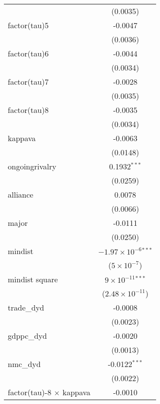 \begin{tabular}{lc}
                                   & (0.0035)\\   
   factor(tau)5                    & -0.0047\\   
                                   & (0.0036)\\   
   factor(tau)6                    & -0.0044\\   
                                   & (0.0034)\\   
   factor(tau)7                    & -0.0028\\   
                                   & (0.0035)\\   
   factor(tau)8                    & -0.0035\\   
                                   & (0.0034)\\   
   kappava                         & -0.0063\\   
                                   & (0.0148)\\   
   ongoingrivalry                  & 0.1932$^{***}$\\   
                                   & (0.0259)\\   
   alliance                        & 0.0078\\   
                                   & (0.0066)\\   
   major                           & -0.0111\\   
                                   & (0.0250)\\   
   mindist                         & $-1.97\times 10^{-6}$$^{***}$\\    
                                   & ($5\times 10^{-7}$)\\    
   mindist square                  & $9\times 10^{-11}$$^{***}$\\    
                                   & ($2.48\times 10^{-11}$)\\    
   trade\_dyd                      & -0.0008\\   
                                   & (0.0023)\\   
   gdppc\_dyd                      & -0.0020\\   
                                   & (0.0013)\\   
   nmc\_dyd                        & -0.0122$^{***}$\\   
                                   & (0.0022)\\   
   factor(tau)-8 $\times$ kappava  & -0.0010\\   

\end{tabular}
